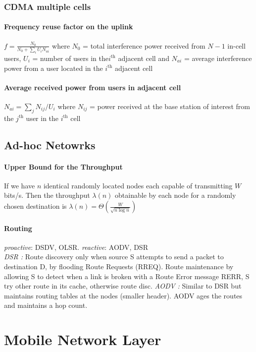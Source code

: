 \documentclass[6pt]{scrartcl}
\begin{document}
\begin{multicols}{4}
\subsubsection{CDMA multiple cells}
\paragraph{Frequency reuse factor on the uplink} 
$f = \frac{N_0}{N_0 + \sum_iU_iN_{ai}}$ where $N_0$ = total interference power received from $N-1$ in-cell users, $U_i$ = number of users in the$i^\text{th}$ adjacent cell and $N_{ai}$ = average interference power from a user located in the $i^\text{th}$ adjacent cell

\paragraph{Average received power from users in adjacent cell}
$N_{ai} = \sum_j N_{ij}/U_i$ where $N_{ij}$ = power received at the base station of interest from the $j^\text{th}$ user in the $i^\text{th}$ cell

\subsection{Ad-hoc Netowrks} %
\paragraph{Upper Bound for the Throughput} 
If we have $n$ identical randomly located nodes each capable of transmitting $W$ bits/s. 
Then the throughput $\lambda(n)$ obtainable by each node for a randomly chosen destination is $\lambda(n) = \Theta\left(\frac W{\sqrt{n\log n}}\right)$

\paragraph{Routing} \emph{proactive}: DSDV, OLSR. \emph{reactive}: AODV, DSR \\
\emph{DSR : } Route discovery only when source S attempts to send a packet to destination D, by flooding Route Requests (RREQ). Route maintenance by allowing S to detect when a link is broken with a Route Error message RERR, S try other route in its cache, otherwise route disc.
\emph{AODV : } Similar to DSR but maintains routing tables at the nodes (smaller header). AODV ages the routes and maintains a hop count.

\section{Mobile Network Layer}

\end{multicols}
\end{document}
